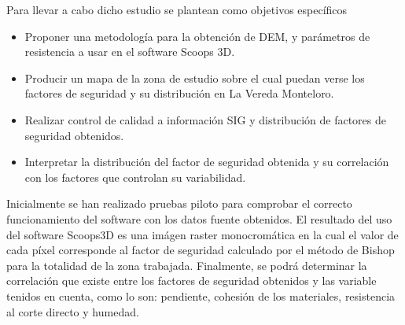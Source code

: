 Para llevar a cabo dicho estudio se plantean como objetivos espec\'ificos 

\begin{itemize}
\item Proponer una metodolog\'ia para la obtenci\'on de DEM, y par\'ametros de resistencia a usar en el software Scoops 3D.
\item Producir un mapa de la zona de estudio sobre el cual puedan verse los factores de seguridad y su distribuci\'on en La Vereda Monteloro.
\item Realizar control de calidad a informaci\'on SIG y distribuci\'on de factores de seguridad obtenidos.
\item Interpretar la distribuci\'on del factor de seguridad obtenida y su correlaci\'on con los factores que controlan su variabilidad.


\end{itemize} 

Inicialmente se han realizado pruebas piloto para comprobar el correcto funcionamiento del software con los datos fuente obtenidos.
El resultado del uso del software Scoops3D es una im\'agen raster monocrom\'atica en la cual el valor de cada p\'ixel corresponde al factor de seguridad calculado por el m\'etodo de Bishop para la totalidad de la zona trabajada. Finalmente, se podr\'a determinar la  correlaci\'on que existe entre los factores de seguridad obtenidos y las variable tenidos en cuenta, como lo son: pendiente, cohesi\'on de los materiales, resistencia al corte directo y humedad.
\\

